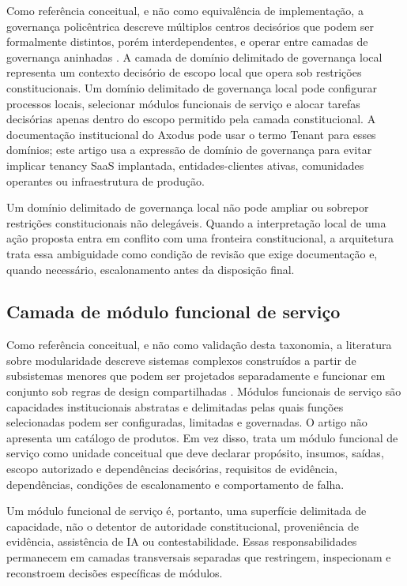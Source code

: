 \documentclass[11pt]{article}
\begin{document}
Como referência conceitual, e não como equivalência de implementação, a
governança policêntrica descreve múltiplos centros decisórios que podem ser
formalmente distintos, porém interdependentes, e operar entre camadas de
governança aninhadas \citep{ostrom2010beyond}.
A camada de domínio delimitado de governança local representa um contexto
decisório de escopo local que opera sob restrições constitucionais. Um domínio
delimitado de governança local pode configurar processos locais, selecionar
módulos funcionais de serviço e alocar tarefas decisórias apenas dentro do
escopo permitido pela camada constitucional. A documentação institucional do
Axodus pode usar o termo Tenant para esses domínios; este artigo usa a
expressão de domínio de governança para evitar implicar tenancy SaaS
implantada, entidades-clientes ativas, comunidades operantes ou infraestrutura
de produção.

Um domínio delimitado de governança local não pode ampliar ou sobrepor
restrições constitucionais não delegáveis. Quando a interpretação local de uma
ação proposta entra em conflito com uma fronteira constitucional, a
arquitetura trata essa ambiguidade como condição de revisão que exige
documentação e, quando necessário, escalonamento antes da disposição final.

\subsection{Camada de módulo funcional de serviço}

Como referência conceitual, e não como validação desta taxonomia, a literatura
sobre modularidade descreve sistemas complexos construídos a partir de
subsistemas menores que podem ser projetados separadamente e funcionar em
conjunto sob regras de design compartilhadas \citep{baldwin2000design}.
Módulos funcionais de serviço são capacidades institucionais abstratas e
delimitadas pelas quais funções selecionadas podem ser configuradas, limitadas
e governadas. O artigo não apresenta um catálogo de produtos. Em vez disso,
trata um módulo funcional de serviço como unidade conceitual que deve declarar
propósito, insumos, saídas, escopo autorizado e dependências decisórias,
requisitos de evidência, dependências, condições de escalonamento e
comportamento de falha.

Um módulo funcional de serviço é, portanto, uma superfície delimitada de
capacidade, não o detentor de autoridade constitucional, proveniência de
evidência, assistência de IA ou contestabilidade. Essas responsabilidades
permanecem em camadas transversais separadas que restringem, inspecionam e
reconstroem decisões específicas de módulos.
\end{document}
